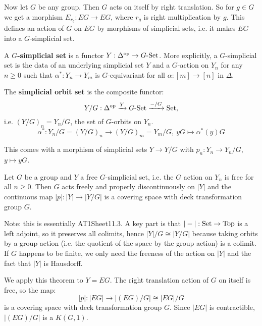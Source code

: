 Now let $G$ be any group. Then $G$ acts on itself by right translation. So for $g\in G$ we get a morphism $E_{{r_g}}:EG\to EG$, where $r_g$ is right multiplication by $g$. This defines an action of $G$ on $EG$ by morphisms of simplicial sets, i.e. it makes $EG$ into a $G$-simplicial set.

A \textbf{$G$-simplicial set} is a functor $Y:\Delta^{\operatorname{op}}\to G\text{-}{\mathrm{Set}}$. More explicitly, a $G$-simplicial set is the data of an underlying simplicial set $Y$ and a $G$-action on $Y_n$ for any $n\geq0$ such that $\alpha^*:Y_n\to Y_m$ is $G$-equivariant for all $\alpha:[m]\to[n]$ in $\Delta$.

The \textbf{simplicial orbit set} is the composite functor:
\[Y/G:\Delta^{\operatorname{op}}\xrightarrow{Y}G\text{-Set}\xrightarrow{-/G}{\mathrm{Set}},\]
i.e. $(Y/G)_n=Y_n/G$, the set of $G$-orbits on $Y_n$.
\[\alpha^*:Y_n/G=(Y/G)_n\to(Y/G)_m=Y_m/G,\ yG\mapsto\alpha^*(y)G\]

This comes with a morphism of simplicial sets $Y\to Y/G$ with $p_n:Y_n\to Y_n/G$, $y\mapsto yG$.

\begin{theorem}
Let $G$ be a group and $Y$ a free $G$-simplicial set, i.e. the $G$ action on $Y_n$ is free for all $n\geq0$. Then $G$ acts freely and properly discontinuously on $|Y|$ and the continuous map $|p|:|Y|\to|Y/G|$ is a covering space with deck transformation group $G$.
\end{theorem}

Note: this is essentially AT1Sheet11.3. A key part is that $|-|:{\mathrm{Set}}\to{\mathrm{Top}}$ is a left adjoint, so it preserves all colimits, hence $|Y|/G\cong|Y/G|$ because taking orbits by a group action (i.e. the quotient of the space by the group action) is a colimit. If $G$ happens to be finite, we only need the freeness of the action on $|Y|$ and the fact that $|Y|$ is Hausdorff.

We apply this theorem to $Y=EG$. The right translation action of $G$ on itself is free, so the map:
\[|p|:|EG|\to|(EG)/G|\cong|EG|/G\]
is a covering space with deck transformation group $G$. Since $|EG|$ is contractible, $|(EG)/G|$ is a $K(G,1)$.

